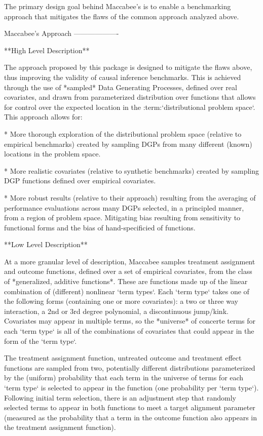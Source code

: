 \documentclass[../main.tex]{subfiles}
\begin{document}
The primary design goal behind Maccabee's is to enable a benchmarking approach that mitigates the flaws of the common approach analyzed above.

Maccabee's Approach
-------------------

**High Level Description**

The approach proposed by this package is designed to mitigate the flaws above, thus improving the validity of causal inference benchmarks. This is achieved through the use of *sampled* Data Generating Processes, defined over real covariates, and drawn from parameterized distribution over functions that allows for control over the expected location in the :term:`distributional problem space`. This approach allows for:

* More thorough exploration of the distributional problem space (relative to empirical benchmarks) created by sampling DGPs from many different (known) locations in the problem space.

* More realistic covariates (relative to synthetic benchmarks) created by sampling DGP functions defined over empirical covariates.

* More robust results (relative to their approach) resulting from the averaging of performance evaluations across many DGPs selected, in a principled manner, from a region of problem space. Mitigating bias resulting from sensitivity to functional forms and the bias of hand-specificied of functions.

**Low Level Description**

At a more granular level of description, Maccabee samples treatment assignment and outcome functions, defined over a set of empirical covariates, from the class of *generalized, additive functions*. These are functions made up of the linear combination of (different) nonlinear `term types`. Each `term type` takes one of the following forms (containing one or more covariates): a two or three way interaction, a 2nd or 3rd degree polynomial, a discontinuous jump/kink. Covariates may appear in multiple terms, so the *universe* of concerte terms for each `term type` is all of the combinations of covariates that could appear in the form of the `term type`.

The treatment assignment function, untreated outcome and treatment effect functions are sampled from two, potentially different distributions parameterized by the (uniform) probability that each term in the universe of terms for each `term type` is selected to appear in the function (one probability per `term type`). Following initial term selection, there is an adjustment step that randomly selected terms to appear in both functions to meet a target alignment parameter (measured as the probability that a term in the outcome function also appears in the treatment assignment function).
\end{document}
